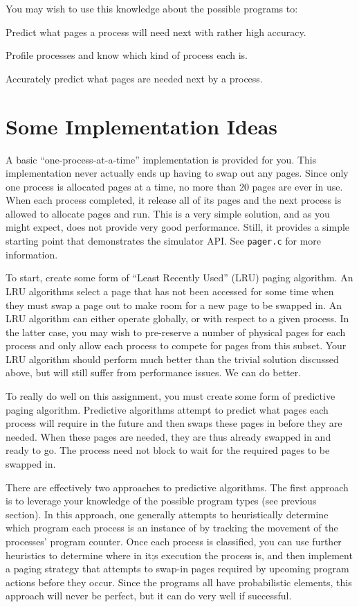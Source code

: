 \documentclass[12pt]{article}
\newenvironment{packed_item}{
\begin{itemize}
  \setlength{\itemsep}{1pt}
  \setlength{\parskip}{0pt}
  \setlength{\parsep}{0pt}
}{\end{itemize}}
\begin{document}
You may wish to use this knowledge about the possible programs to:
\begin{packed_item}
\item Predict what pages a process will need next with rather high accuracy.
\item Profile processes and know which kind of process each is.
\item Accurately predict what pages are needed next by a process.
\end{packed_item}

\section{Some Implementation Ideas}

A basic ``one-process-at-a-time'' implementation is provided for
you. This implementation never actually ends up having to swap out any
pages. Since only one process is allocated pages at a time, no more than
20 pages are ever in use. When each process completed, it release all
of its pages and the next process is allowed to allocate pages and
run. This is a very simple solution, and as you might expect, does not
provide very good performance. Still, it provides a simple starting
point that demonstrates the simulator API. See \texttt{pager.c} for more
information.

To start, create some form of ``Least Recently Used'' (LRU) paging
algorithm. An LRU algorithms select a page that has not been accessed
for some time when they must swap a page out to make room for a new
page to be swapped in. An LRU algorithm can either operate globally, or
with respect to a given process. In the latter case, you may wish to
pre-reserve a number of physical pages for each process and only allow
each process to compete for pages from this subset. Your LRU algorithm
should perform much better than the trivial solution discussed above,
but will still suffer from performance issues. We can do better.

To really do well on this assignment, you must create some form of
predictive paging algorithm. Predictive algorithms attempt to predict
what pages each process will require in the future and then swaps
these pages in before they are needed. When these pages are needed,
they are thus already swapped in and ready to go. The process need not
block to wait for the required pages to be swapped in.

There are effectively two approaches to predictive algorithms. The
first approach is to leverage your knowledge of the possible program
types (see previous section). In this approach, one generally attempts
to heuristically determine which program each process is an instance of
by tracking the movement of the processes' program counter. Once each
process is classified, you can use further heuristics to determine where
in it;s execution the process is, and then implement a paging strategy
that attempts to swap-in pages required by upcoming program actions
before they occur. Since the programs all have probabilistic elements,
this approach will never be perfect, but it can do very well if
successful.
\end{document}

